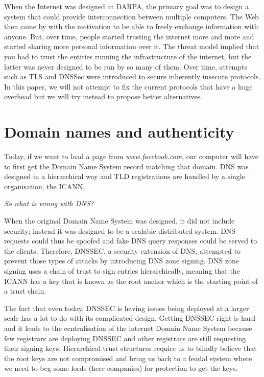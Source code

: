 \documentclass{vldb}
\begin{document}
When the Internet was designed at DARPA, the primary goal was to design a system that could provide interconnection between multiple computers. The Web then came by with the motivation to be able to freely exchange information with anyone. But, over time, people started trusting the internet more and more and started sharing more personal information over it. The threat model implied that you had to trust the entities running the infrastructure of the internet, but the latter was never designed to be run by so many of them. Over time, attempts such as TLS and DNSSec were introduced to secure inherently insecure protocols. In this paper, we will not attempt to fix the current protocols that have a huge overhead but we will try instead to propose better alternatives.

\section{Domain names and authenticity}

Today, if we want to load a page from \emph{www.facebook.com}, our computer will have to first get the Domain Name System record matching that domain. DNS was designed in a hierarchical way and TLD registrations are handled by a single organisation, the ICANN.

\emph{So what is wrong with DNS?}

When the original Domain Name System was designed, it did not include security; instead it was designed to be a scalable distributed system. DNS requests could thus be spoofed and fake DNS query responses could be served to the clients. Therefore, DNSSEC, a security extension of DNS, attempted to prevent those types of attacks by introducing DNS zone signing. DNS zone signing uses a chain of trust to sign entries hierarchically,  meaning that the ICANN has a key that is known as the root anchor which is the starting point of a trust chain.

The fact that even today, DNSSEC is having issues being deployed at a larger scale has a lot to do with its complicated design. Getting DNSSEC right is hard and it leads to the centralisation of the internet Domain Name System because few registrars are deploying DNSSEC and other registrars are still requesting their signing keys. Hierarchical trust structures require us to blindly believe that the root keys are not compromised and bring us back to a feudal system where we need to beg some lords (here companies) for protection to get the keys.
\end{document}
